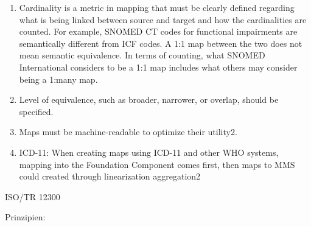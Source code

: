\begin{enumerate}
\item Cardinality is a metric in mapping that must be clearly defined regarding what is
being linked between source and target and how the cardinalities are counted.
For example, SNOMED CT codes for functional impairments are semantically
different from ICF codes. A 1:1 map between the two does not mean semantic
equivalence. In terms of counting, what SNOMED International considers to be a
1:1 map includes what others may consider being a 1:many map.
\item Level of equivalence, such as broader, narrower, or overlap, should be specified.
\item Maps must be machine-readable to optimize their utility2.
\item ICD-11: When creating maps using ICD-11 and other WHO systems, mapping
into the Foundation Component comes first, then maps to MMS could created
through linearization aggregation2
\end{enumerate}

ISO/TR 12300

Prinzipien:

